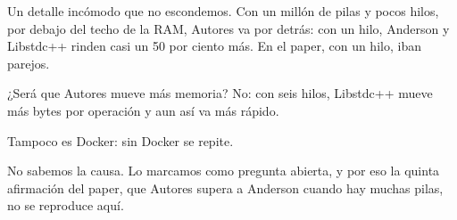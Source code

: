 Un detalle incómodo que no escondemos. Con un millón de pilas y pocos hilos, por debajo del techo de la RAM, Autores va por detrás: con un hilo, Anderson y Libstdc++ rinden casi un 50 por ciento más. En el paper, con un hilo, iban parejos.

¿Será que Autores mueve más memoria? No: con seis hilos, Libstdc++ mueve más bytes por operación y aun así va más rápido.

Tampoco es Docker: sin Docker se repite.

No sabemos la causa. Lo marcamos como pregunta abierta, y por eso la quinta afirmación del paper, que Autores supera a Anderson cuando hay muchas pilas, no se reproduce aquí.
